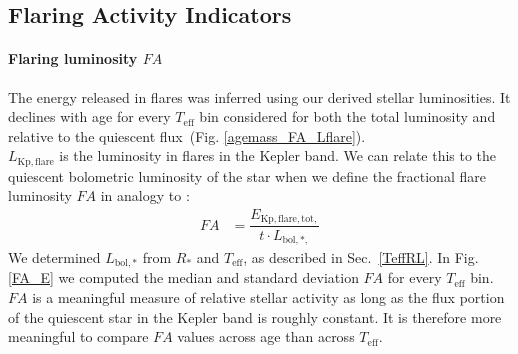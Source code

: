 \documentclass{aa}
\begin{document}
\subsection{Flaring Activity Indicators}
\paragraph{Flaring luminosity $FA$}
The energy released in flares was inferred using our derived stellar luminosities. It declines with age for every $T_\mathrm{eff}$ bin considered for both the total luminosity and relative to the quiescent flux~(Fig. \ref{agemass_FA_Lflare}).
\\
$L_\mathrm{Kp,flare}$ is the luminosity in flares in the Kepler band. We can relate this to the quiescent bolometric luminosity of the star when we define the fractional flare luminosity $FA$ in analogy to :
\begin{align}
\label{FA}
FA&=\dfrac{E_\mathrm{Kp,flare,tot,}}{t\cdot L_{\mathrm{bol,*,}}}
\end{align}
We determined $L_\mathrm{bol,*}$ from $R_*$ and $T_\mathrm{eff}$, as described in Sec.~\ref{TeffRL}. In Fig. \ref{FA_E} we computed the median and standard deviation $FA$ for every $T_\mathrm{eff}$ bin. $FA$ is a meaningful measure of relative stellar activity as long as the flux portion of the quiescent star in the Kepler band is roughly constant. It is therefore more meaningful to compare $FA$ values across age than across $T_\mathrm{eff}$.
\end{document}
